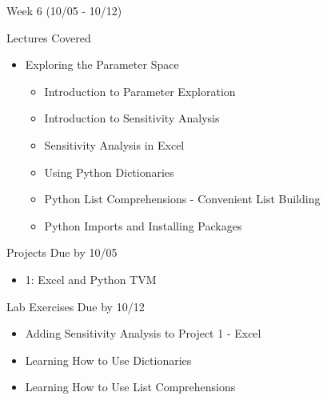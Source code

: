\documentclass[]{article}
\begin{document}
\begin{section}{Week 6 (10/05 - 10/12)}
\begin{subsection}{Lectures Covered}
\begin{itemize}
\item Exploring the Parameter Space
\begin{itemize}
\item Introduction to Parameter Exploration
\item Introduction to Sensitivity Analysis
\item Sensitivity Analysis in Excel
\item Using Python Dictionaries
\item Python List Comprehensions - Convenient List Building
\item Python Imports and Installing Packages
\end{itemize}
\end{itemize}
\end{subsection}
\begin{subsection}{Projects Due by 10/05}
\begin{itemize}
\item 1: Excel and Python TVM
\end{itemize}
\end{subsection}
\begin{subsection}{Lab Exercises Due by 10/12}
\begin{itemize}
\item Adding Sensitivity Analysis to Project 1 - Excel
\item Learning How to Use Dictionaries
\item Learning How to Use List Comprehensions
\end{itemize}
\end{subsection}
\end{section}
\end{document}
